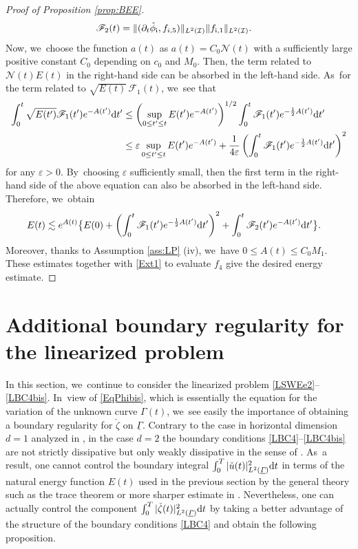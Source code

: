 \documentclass[10pt]{amsart}
\let\epsilon\varepsilon
\newcommand{\dt}{\partial_t}
\newcommand{\cI}{{\mathcal I}}
\newcommand{\ul}[1]{\underline{#1}}
\newcommand{\itGamma}{\mathit{\Gamma}}
\theoremstyle{definition}
\begin{document}
\begin{proof}[Proof of Proposition \ref{prop:BEE}]
\begin{align*}
\mathscr{F}_2(t)
&= \|(\dt\check{\phi}_\mathrm{i},f_{i,5})\|_{L^2(\cI)}\|f_{{\rm i},1}\|_{L^2(\cI)}.
\end{align*}
Now, we~choose the function $a(t)$ as $a(t)=C_0\mathscr{N}(t)$ with a sufficiently large positive constant $C_0$ depending on $c_0$ and $M_0$.
Then, the term related to $\mathscr{N}(t)E(t)$ in the right-hand side can be absorbed in the left-hand side. As~for the term related to $\sqrt{E(t)}\,\mathscr{F}_1(t)$, we~see that
\begin{align*}
\int_0^t \sqrt{E(t')}\mathscr{F}_1(t')e^{-A(t')} {\rm d}t'
&\leq \left(\sup_{0\leq t'\leq t} E(t')e^{-A(t')} \right)^{1/2}\int_0^t \mathscr{F}_1(t')e^{-\frac12A(t')}{\rm d}t' \\
&\leq \epsilon \sup_{0\leq t'\leq t} E(t')e^{-A(t')} + \frac{1}{4\epsilon}\left(\int_0^t \mathscr{F}_1(t')e^{-\frac12A(t')}{\rm d}t' \right)^2
\end{align*}
for any $\epsilon>0$. By~choosing $\epsilon$ sufficiently small, then the first term in the right-hand side of the above equation can also be absorbed in the left-hand side.
Therefore, we~obtain
\begin{align*}
E(t) &\lesssim e^{A(t)} \bigl\{ E(0) + \left(\int_0^t \mathscr{F}_1(t')e^{-\frac12A(t')}{\rm d}t' \right)^2
+ \int_0^t \mathscr{F}_2(t')e^{-A(t')} {\rm d}t' \bigr\}.
\end{align*}
Moreover, thanks to Assumption \ref{ass:LP} (iv), we~have $0\leq A(t)\leq C_0M_1$.
These estimates together with \eqref{Ext1} to evaluate $f_4$ give the desired energy estimate.
\end{proof}

\section{Additional boundary regularity for the linearized problem}\label{sect:AddBR}
In this section, we~continue to consider the linearized problem \eqref{LSWEe2}--\eqref{LBC4bis}. In~view of \eqref{EqPhibis}, which is essentially the equation for the variation of the unknown curve $\itGamma(t)$, we~see easily the importance of obtaining a boundary regularity for $\check{\zeta}$ on $\ul{\itGamma}$.
Contrary to the case in horizontal dimension $d=1$ analyzed in \cite{IguchiLannes2021},
in the case $d=2$ the boundary conditions \eqref{LBC4}--\eqref{LBC4bis} are not strictly dissipative but only weakly dissipative
in the sense of \cite{IguchiLannes2023}. As~a result, one cannot control the boundary integral $\int_0^T|\check{u}(t)|_{L^2(\ul{\itGamma})}^2 {\rm d}t$ in terms of the natural energy function $E(t)$
used in the previous section by the general theory such as the trace theorem or more sharper estimate in \cite{Tataru1998}.
Nevertheless, one can actually control the component $\int_0^T|\check{\zeta}(t)|_{L^2(\ul{\itGamma})}^2 {\rm d}t$ by taking a better advantage of the structure
of the boundary conditions \eqref{LBC4} and obtain the following proposition.
\end{document}
